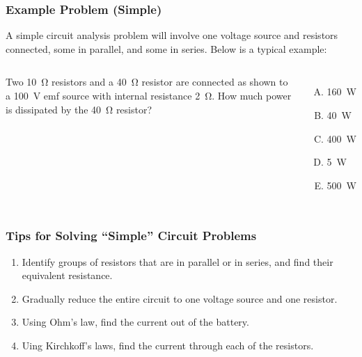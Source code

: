 \documentclass[12pt,aspectratio=169]{beamer}
\begin{document}
\begin{frame}
  \frametitle{Example Problem (Simple)}
  A simple circuit analysis problem will involve one voltage source and
  resistors connected, some in parallel, and some in series. Below is a typical
  example:

  \vspace{.2in}
  \begin{columns}
    Two \SI{10}{\ohm} resistors and a \SI{40}{\ohm} resistor are connected as
    shown to a \SI{100}{\volt} emf source with internal resistance
    \SI{2}{\ohm}. How much power is dissipated by the \SI{40}{\ohm} resistor?
    \begin{enumerate}[(A)]
    \item\SI{160}{\watt}
    \item\SI{40}{\watt}
    \item\SI{400}{\watt}
    \item\SI{5}{\watt}
    \item\SI{500}{\watt}
    \end{enumerate}
  \end{columns}
\end{frame}


\begin{frame}
  \frametitle{Tips for Solving ``Simple'' Circuit Problems}
  \begin{enumerate}
  \item Identify groups of resistors that are in parallel or in series, and
    find their equivalent resistance.
  \item Gradually reduce the entire circuit to one voltage source and one
    resistor.
  \item Using Ohm's law, find the current out of the battery.
  \item Uing Kirchkoff's laws, find the current through each of the resistors.
  \end{enumerate}
\end{frame}
\end{document}
